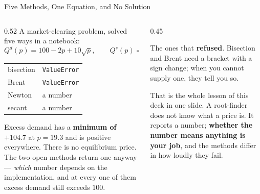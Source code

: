 \begin{frame}{Five Methods, One Equation, and No Solution}
\begin{columns}[T]
\begin{column}{0.52\textwidth}
\small
A market-clearing problem, solved five ways in a notebook:
\[
  Q^{d}(p)=100-2p+10\sqrt p, \qquad Q^{s}(p)=-20+3p-0.1p^{2}.
\]
\begin{center}\footnotesize
\begin{tabularx}{\linewidth}{@{}>{\raggedright\arraybackslash}p{2.0cm} >{\raggedright\arraybackslash}X@{}}
\toprule
bisection & \texttt{ValueError} \\
Brent & \texttt{ValueError} \\
Newton & a number \\
secant & a number \\
\bottomrule
\end{tabularx}
\end{center}
\medskip
\footnotesize
Excess demand has a \textbf{minimum of $+104.7$} at $p=19.3$ and is positive everywhere. There is no equilibrium price. The two open methods return one anyway --- \emph{which} number depends on the implementation, and at every one of them excess demand still exceeds $100$.
\end{column}
\begin{column}{0.45\textwidth}
\begin{cautionbox}[title=\textbf{Which two behaved well?}]\small
The ones that \textbf{refused}. Bisection and Brent need a bracket with a sign change; when you cannot supply one, they tell you so.
\end{cautionbox}
\medskip
\begin{takeawaybox}\footnotesize
That is the whole lesson of this deck in one slide. A root-finder does not know what a price is. It reports a number; \textbf{whether the number means anything is your job}, and the methods differ in how loudly they fail.
\end{takeawaybox}
\end{column}
\end{columns}
\end{frame}

